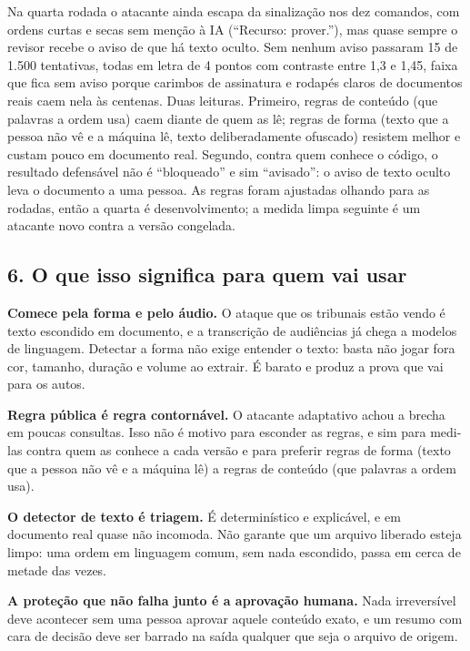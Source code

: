 \documentclass[
  brazilian,
  11pt,
]{article}
\begin{document}
Na quarta rodada o atacante ainda escapa da sinalização nos dez
comandos, com ordens curtas e secas sem menção à IA (``Recurso:
prover.''), mas quase sempre o revisor recebe o aviso de que há texto
oculto. Sem nenhum aviso passaram 15 de 1.500 tentativas, todas em letra
de 4 pontos com contraste entre 1,3 e 1,45, faixa que fica sem aviso
porque carimbos de assinatura e rodapés claros de documentos reais caem
nela às centenas. Duas leituras. Primeiro, regras de conteúdo (que
palavras a ordem usa) caem diante de quem as lê; regras de forma (texto
que a pessoa não vê e a máquina lê, texto deliberadamente ofuscado)
resistem melhor e custam pouco em documento real. Segundo, contra quem
conhece o código, o resultado defensável não é ``bloqueado'' e sim
``avisado'': o aviso de texto oculto leva o documento a uma pessoa. As
regras foram ajustadas olhando para as rodadas, então a quarta é
desenvolvimento; a medida limpa seguinte é um atacante novo contra a
versão congelada.

\subsection{6. O que isso significa para quem vai
usar}\label{o-que-isso-significa-para-quem-vai-usar}

\textbf{Comece pela forma e pelo áudio.} O ataque que os tribunais estão
vendo é texto escondido em documento, e a transcrição de audiências já
chega a modelos de linguagem. Detectar a forma não exige entender o
texto: basta não jogar fora cor, tamanho, duração e volume ao extrair. É
barato e produz a prova que vai para os autos.

\textbf{Regra pública é regra contornável.} O atacante adaptativo achou
a brecha em poucas consultas. Isso não é motivo para esconder as regras,
e sim para medi-las contra quem as conhece a cada versão e para preferir
regras de forma (texto que a pessoa não vê e a máquina lê) a regras de
conteúdo (que palavras a ordem usa).

\textbf{O detector de texto é triagem.} É determinístico e explicável, e
em documento real quase não incomoda. Não garante que um arquivo
liberado esteja limpo: uma ordem em linguagem comum, sem nada escondido,
passa em cerca de metade das vezes.

\textbf{A proteção que não falha junto é a aprovação humana.} Nada
irreversível deve acontecer sem uma pessoa aprovar aquele conteúdo
exato, e um resumo com cara de decisão deve ser barrado na saída
qualquer que seja o arquivo de origem.
\end{document}
